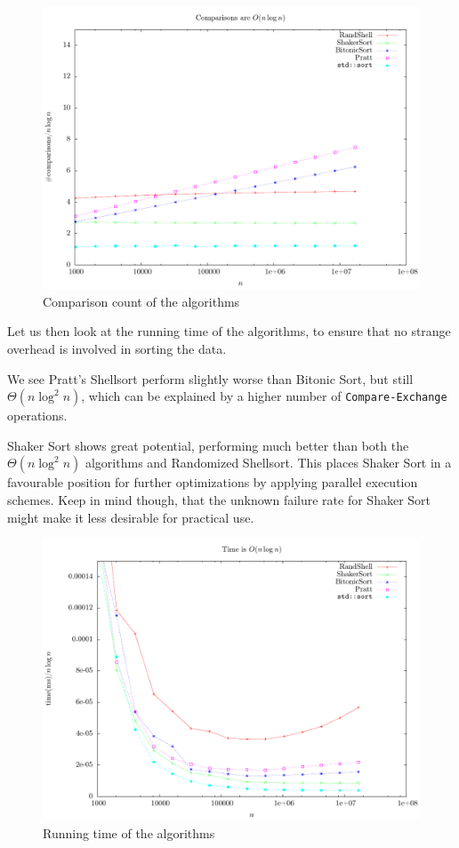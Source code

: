\begin{figure}
\center
\includegraphics[width=\textwidth]{graphs/Shellsorts/nlogncomparisons.pdf}
\caption{Comparison count of the algorithms}
\label{fig:Shellsorts:comparisons}
\end{figure}

Let us then look at the running time of the algorithms, to ensure that no strange overhead is involved in sorting the data.

We see Pratt's Shellsort perform slightly worse than Bitonic Sort, but still $\Theta(n \log^2 n)$, which can be explained by a higher number of \texttt{Compare-Exchange} operations.

Shaker Sort shows great potential, performing much better than both the $\Theta(n \log^2 n)$ algorithms and Randomized Shellsort. This places Shaker Sort in a favourable position for further optimizations by applying parallel execution schemes. Keep in mind though, that the unknown failure rate for Shaker Sort might make it less desirable for practical use.
 
\begin{figure}
\center
\includegraphics[width=\textwidth]{graphs/Shellsorts/nlogntime.pdf}
\caption{Running time of the algorithms}
\label{fig:Shellsorts:time}
\end{figure}

